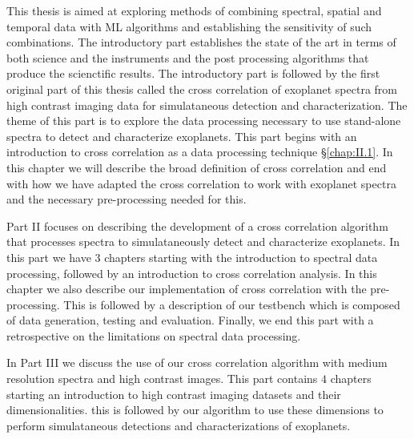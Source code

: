 This thesis is aimed at exploring methods of combining spectral, spatial and temporal data with ML algorithms and establishing the sensitivity 
of such combinations. 
The introductory part establishes the state of the art in terms of both science and the instruments and the post processing algorithms that produce the scienctific results.
The introductory part is followed by the first original part of this thesis called the cross correlation of exoplanet spectra from high contrast imaging data for simulataneous detection and characterization.
The theme of this part is to explore the data processing necessary to use stand-alone spectra to detect and characterize exoplanets.
This part begins with an introduction to cross correlation as a data processing technique \S \ref{chap:II.1}. 
In this chapter we will describe the broad definition of cross correlation and end with how we have adapted the cross correlation to  work with exoplanet spectra and the necessary pre-processing needed for this.

Part II focuses on describing the development of a cross correlation algorithm that processes spectra to simulataneously\@
detect and characterize exoplanets.
In this part we have $3$ chapters starting with the introduction to spectral data processing, followed by an introduction
to cross correlation analysis. 
In this chapter we also describe our implementation of cross correlation with the pre-processing.
This is followed by a description of our testbench which is composed of data generation, testing and evaluation.
Finally, we end this part with a retrospective on the limitations on spectral data processing. 

In Part III we discuss the use of our cross correlation algorithm with medium resolution spectra and high contrast images.
This part contains $4$ chapters starting an introduction to high contrast imaging datasets and their dimensionalities.
this is followed by our algorithm to use these dimensions to perform simulataneous detections and characterizations of exoplanets.
